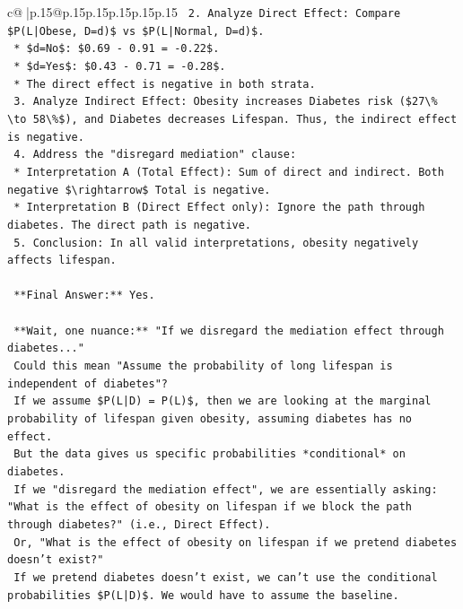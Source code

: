 \documentclass{article}
\begin{document}
{\begin{supertabular}{c@{$\;$}|p{.15\linewidth}@{}p{.15\linewidth}p{.15\linewidth}p{.15\linewidth}p{.15\linewidth}p{.15\linewidth}}
{{{\texttt{    2.  Analyze Direct Effect: Compare \$P(L|Obese, D=d)\$ vs \$P(L|Normal, D=d)\$.} \\
\texttt{        *   \$d=No\$: \$0.69 {-} 0.91 = {-}0.22\$.} \\
\texttt{        *   \$d=Yes\$: \$0.43 {-} 0.71 = {-}0.28\$.} \\
\texttt{        *   The direct effect is negative in both strata.} \\
\texttt{    3.  Analyze Indirect Effect: Obesity increases Diabetes risk (\$27\textbackslash{}\% \textbackslash{}to 58\textbackslash{}\%\$), and Diabetes decreases Lifespan. Thus, the indirect effect is negative.} \\
\texttt{    4.  Address the "disregard mediation" clause:} \\
\texttt{        *   Interpretation A (Total Effect): Sum of direct and indirect. Both negative \$\textbackslash{}rightarrow\$ Total is negative.} \\
\texttt{        *   Interpretation B (Direct Effect only): Ignore the path through diabetes. The direct path is negative.} \\
\texttt{    5.  Conclusion: In all valid interpretations, obesity negatively affects lifespan.} \\
\\ 
\texttt{    **Final Answer:** Yes.} \\
\\ 
\texttt{    **Wait, one nuance:** "If we disregard the mediation effect through diabetes..."} \\
\texttt{    Could this mean "Assume the probability of long lifespan is independent of diabetes"?} \\
\texttt{    If we assume \$P(L|D) = P(L)\$, then we are looking at the marginal probability of lifespan given obesity, assuming diabetes has no effect.} \\
\texttt{    But the data gives us specific probabilities *conditional* on diabetes.} \\
\texttt{    If we "disregard the mediation effect", we are essentially asking: "What is the effect of obesity on lifespan if we block the path through diabetes?" (i.e., Direct Effect).} \\
\texttt{    Or, "What is the effect of obesity on lifespan if we pretend diabetes doesn't exist?"} \\
\texttt{    If we pretend diabetes doesn't exist, we can't use the conditional probabilities \$P(L|D)\$. We would have to assume the baseline.} \\
}}}
\end{supertabular}}
\end{document}

